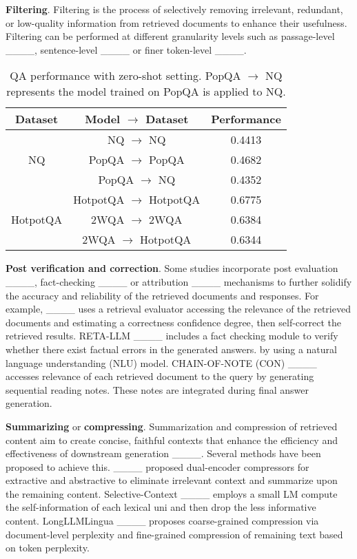 \textbf{Filtering}. Filtering is the process of selectively removing irrelevant, redundant, or low-quality information from retrieved documents to enhance their usefulness. Filtering can be performed at different granularity levels such as passage-level ____, sentence-level ____ or finer token-level ____.  %
\begin{table}[H]
\caption{\textmd{QA performance with zero-shot setting. PopQA $\to$ NQ represents the model trained on PopQA is applied to NQ.}}
  \centering
    \begin{tabular}{ccc}
          \toprule
          \textbf{Dataset} & \textbf{Model $\to$ Dataset}  & \textbf{Performance} \\ \hline
     \multirow{3}[3]{*}{NQ} & NQ $\to$ NQ & 0.4413 \\
     & PopQA $\to$ PopQA & 0.4682 \\
     & PopQA $\to$ NQ & 0.4352 \\
    \midrule
    \multirow{3}[3]{*}{HotpotQA} & HotpotQA $\to$ HotpotQA & 0.6775 \\
     & 2WQA $\to$ 2WQA & 0.6384 \\
     & 2WQA $\to$ HotpotQA & 0.6344 \\
    \bottomrule
    \end{tabular}
  \label{tab:zero-shot}%
\end{table}%
 \textbf{Post verification and correction}. Some studies incorporate post evaluation ____, fact-checking ____ or attribution ____ mechanisms to further solidify the accuracy and reliability of the retrieved documents and responses. For example,  ____ uses a retrieval evaluator accessing the relevance of the retrieved documents and estimating a correctness confidence degree, then self-correct the retrieved results. RETA-LLM ____ includes a fact checking module to verify whether there exist factual errors in the generated answers. by using a natural language understanding (NLU) model. CHAIN-OF-NOTE (CON) ____ accesses relevance of each retrieved document to the query by generating sequential reading notes. These notes are integrated during final answer generation. 
 
 \textbf{Summarizing} or \textbf{compressing}. Summarization and compression of retrieved content aim to create concise, faithful contexts that enhance the efficiency and effectiveness of downstream generation ____. Several methods have been proposed to achieve this. ____ proposed dual-encoder compressors for extractive and abstractive to eliminate irrelevant context and summarize upon the remaining content. Selective-Context ____ employs a small LM  compute the self-information of each lexical uni and then drop the less informative content. LongLLMLingua ____ proposes coarse-grained compression via document-level perplexity and fine-grained compression of remaining text based on token perplexity. 
 
